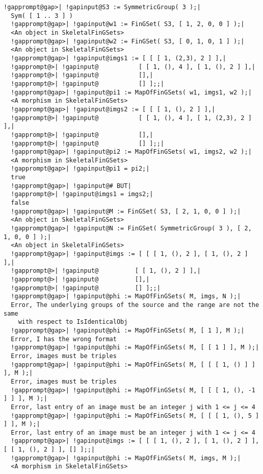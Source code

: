 \documentclass[a4paper,11pt]{report}
\begin{document}
{{ 
\begin{Verbatim}[commandchars=!@|,fontsize=\small,frame=single,label=Example]
  !gapprompt@gap>| !gapinput@S3 := SymmetricGroup( 3 );|
  Sym( [ 1 .. 3 ] )
  !gapprompt@gap>| !gapinput@w1 := FinGSet( S3, [ 1, 2, 0, 0 ] );|
  <An object in SkeletalFinGSets>
  !gapprompt@gap>| !gapinput@w2 := FinGSet( S3, [ 0, 1, 0, 1 ] );|
  <An object in SkeletalFinGSets>
  !gapprompt@gap>| !gapinput@imgs1 := [ [ [ 1, (2,3), 2 ] ],|
  !gapprompt@>| !gapinput@           [ [ 1, (), 4 ], [ 1, (), 2 ] ],|
  !gapprompt@>| !gapinput@           [],|
  !gapprompt@>| !gapinput@           [] ];;|
  !gapprompt@gap>| !gapinput@pi1 := MapOfFinGSets( w1, imgs1, w2 );|
  <A morphism in SkeletalFinGSets>
  !gapprompt@gap>| !gapinput@imgs2 := [ [ [ 1, (), 2 ] ],|
  !gapprompt@>| !gapinput@           [ [ 1, (), 4 ], [ 1, (2,3), 2 ] ],|
  !gapprompt@>| !gapinput@           [],|
  !gapprompt@>| !gapinput@           [] ];;|
  !gapprompt@gap>| !gapinput@pi2 := MapOfFinGSets( w1, imgs2, w2 );|
  <A morphism in SkeletalFinGSets>
  !gapprompt@gap>| !gapinput@pi1 = pi2;|
  true
  !gapprompt@gap>| !gapinput@# BUT|
  !gapprompt@>| !gapinput@imgs1 = imgs2;|
  false
  !gapprompt@gap>| !gapinput@M := FinGSet( S3, [ 2, 1, 0, 0 ] );|
  <An object in SkeletalFinGSets>
  !gapprompt@gap>| !gapinput@N := FinGSet( SymmetricGroup( 3 ), [ 2, 1, 0, 0 ] );|
  <An object in SkeletalFinGSets>
  !gapprompt@gap>| !gapinput@imgs := [ [ [ 1, (), 2 ], [ 1, (), 2 ] ],|
  !gapprompt@>| !gapinput@          [ [ 1, (), 2 ] ],|
  !gapprompt@>| !gapinput@          [],|
  !gapprompt@>| !gapinput@          [] ];;|
  !gapprompt@gap>| !gapinput@phi := MapOfFinGSets( M, imgs, N );|
  Error, The underlying groups of the source and the range are not the same
    with respect to IsIdenticalObj
  !gapprompt@gap>| !gapinput@phi := MapOfFinGSets( M, [ 1 ], M );|
  Error, I has the wrong format
  !gapprompt@gap>| !gapinput@phi := MapOfFinGSets( M, [ [ 1 ] ], M );|
  Error, images must be triples
  !gapprompt@gap>| !gapinput@phi := MapOfFinGSets( M, [ [ [ 1, () ] ] ], M );|
  Error, images must be triples
  !gapprompt@gap>| !gapinput@phi := MapOfFinGSets( M, [ [ [ 1, (), -1 ] ] ], M );|
  Error, last entry of an image must be an integer j with 1 <= j <= 4
  !gapprompt@gap>| !gapinput@phi := MapOfFinGSets( M, [ [ [ 1, (), 5 ] ] ], M );|
  Error, last entry of an image must be an integer j with 1 <= j <= 4
  !gapprompt@gap>| !gapinput@imgs := [ [ [ 1, (), 2 ], [ 1, (), 2 ] ], [ [ 1, (), 2 ] ], [] ];;|
  !gapprompt@gap>| !gapinput@phi := MapOfFinGSets( M, imgs, M );|
  <A morphism in SkeletalFinGSets>

\end{Verbatim}}}
\end{document}
